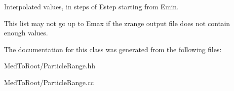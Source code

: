 Interpolated values, in steps of Estep starting from Emin. 

This list may not go up to Emax if the zrange output file does not contain enough values. 

The documentation for this class was generated from the following files\+:\begin{DoxyCompactItemize}
\item 
Med\+To\+Root/Particle\+Range.\+hh\item 
Med\+To\+Root/Particle\+Range.\+cc\end{DoxyCompactItemize}
